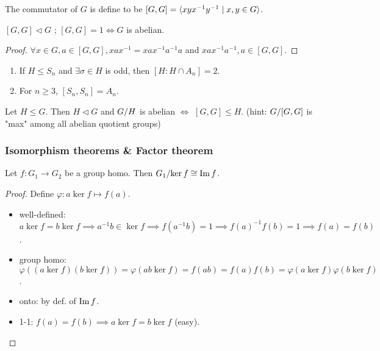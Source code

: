 \begin{definition}
  The commutator of $G$ is define to be $[G,G] = \langle xyx^{-1}y^{-1} \mid
  x,y \in G\rangle$.
\end{definition}

\begin{prop}
  $[G,G] \lhd G$ ; $[G,G] = 1 \iff G$ is abelian.
  \begin{proof}
    $\forall x \in G, a \in [G,G], xax^{-1} = xax^{-1}a^{-1}a$ and
    $xax^{-1}a^{-1}, a \in [G,G]$.
  \end{proof}
\end{prop}

\begin{exercise} \mbox{}
  \begin{enumerate}
    \item If $H \le S_n$ and $\exists \sigma \in H$ is odd, then $[H:H\cap A_n] = 2$.
    \item For $n \ge 3$, $[S_n, S_n] = A_n$.
  \end{enumerate}
\end{exercise}

\begin{exercise}
  Let $H \le G$. Then  $H \lhd G$ and ${G}/{H}$ is abelian $\iff$
  $[G,G] \le H$.
  (hint: ${G}/{[G,G]}$ is "max" among all abelian quotient groups)
\end{exercise}


\subsubsection{Isomorphism theorems \& Factor theorem}
\begin{theorem}
  Let $f: G_1 \to G_2$ be a group homo. Then ${G_1}/{\ker f} \cong \operatorname{Im} f$.
  \begin{proof}
    Define $\varphi: a \ker f \mapsto f(a)$.
    \begin{itemize}
      \item well-defined: $a \ker f = b \ker f \implies a^{-1}b \in \ker f
        \implies f(a^{-1}b) = 1 \implies f(a)^{-1}f(b) = 1 \implies f(a)=f(b)$.
      \item group homo: $\varphi\left((a \ker f)(b\ker f)\right) = 
        \varphi(ab \ker f) = f(ab) = f(a)f(b) =
        \varphi(a\ker f)\varphi(b\ker f)$.
      \item onto: by def. of $\operatorname{Im} f$.
      \item 1-1: $f(a) = f(b) \implies a \ker f = b \ker f$ (easy).
      \end{itemize}
  \end{proof}
\end{theorem}

